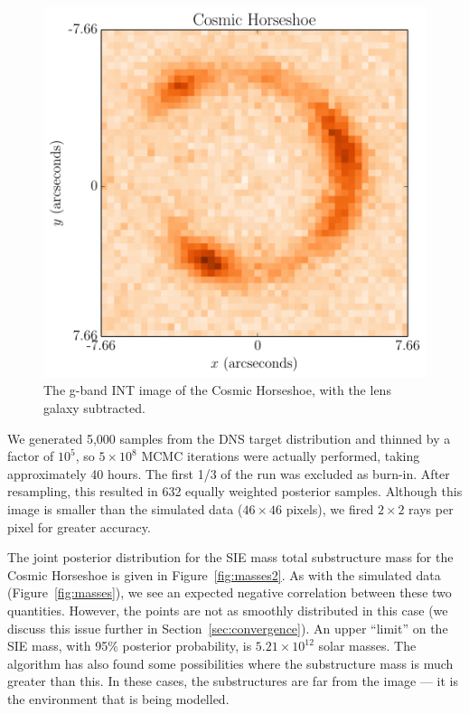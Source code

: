 \documentclass[useAMS,usenatbib]{mn2e}
\begin{document}
\begin{figure}
\begin{center}
\includegraphics[scale=0.5]{horseshoe_image.pdf}
\caption{The g-band INT image of the Cosmic Horseshoe, with the lens galaxy
subtracted.
\label{fig:horseshoe_image}}
\end{center}
\end{figure}

We generated 5,000 samples from the DNS target distribution and thinned
by a factor of $10^5$, so $5 \times 10^8$ MCMC iterations were actually
performed, taking approximately 40 hours. The first 1/3 of the run was
excluded as burn-in. After resampling, this resulted in 632
equally weighted posterior samples. Although this image is smaller than the
simulated data ($46 \times 46$ pixels), we fired $2 \times 2$ rays per pixel
for greater accuracy.

The joint posterior distribution for the SIE mass total substructure mass
for the Cosmic Horseshoe is given in Figure~\ref{fig:masses2}. As with
the simulated data (Figure~\ref{fig:masses}), we see an expected negative
correlation between these two quantities. However, the points are not as
smoothly distributed in this case (we discuss this issue further
in Section~\ref{sec:convergence}). An upper ``limit'' on the SIE mass, with
95\% posterior probability, is $5.21 \times 10^{12}$ solar masses.
The algorithm has also found
some possibilities where the substructure mass is much greater than this. In
these cases, the substructures are far from the image --- it is the environment
that is being modelled.
\end{document}
